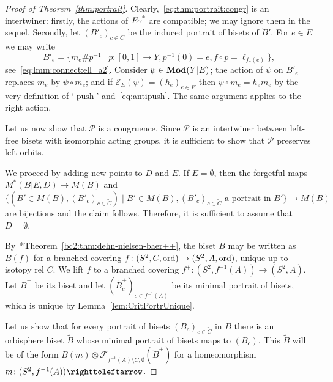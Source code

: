 \documentclass{amsart}
\newcommand\Forget{{\mathcal F}}
\newcommand\Antipush{{\mathcal E}}
\newcommand\Push{{\operatorname{push}}}
\newcommand\wtB{{\widetilde B}}
\newcommand\wtC{{\widetilde C}}
\begin{document}
\begin{proof}[Proof of Theorem~\ref{thm:portrait}]
  Clearly,~\eqref{eq:thm:portrait:congr} is an intertwiner: firstly,
  the actions of $E{\stackrel{\downarrow}{\smash.}}^*$ are compatible; we may ignore them in the
  sequel. Secondly, let $(B'_c)_{c\in \wtC}$ be
  the induced portrait of bisets of $\wtB'$.  For $e\in E$ we
  may write
  \[B'_e=\{m_e\#p^{-1}\mid p\colon[0,1]\to Y,p^{-1}(0)=e,f\circ p=\ell_{f_*(e)}\},
  \]
  see~\eqref{eq:lmm:connect:ell_a2}. Consider $\psi \in \mathbf{\relax Mod}(Y|E)$;
  the action of $\psi$ on $B'_e$ replaces $m_e$ by $\psi\circ m_e$;
  and if $\Antipush_E(\psi)=(h_e)_{e\in E}$ then $\psi\circ m_e=h_e m_e$
  by the very definition of `$\Push$' and~\eqref{eq:antipush}. The same
  argument applies to the right action.

  Let us now show that $\mathcal P$ is a congruence. Since
  $\mathcal P$ is an intertwiner between left-free bisets with
  isomorphic acting groups, it is sufficient to show that $\mathcal P$
  preserves left orbits.

  We proceed by adding new points to $D$ and $E$. If $E=\emptyset$,
  then the forgetful maps $M^*(B|E,D)\to M(B)$ and
  \[\big\{(B'\in M(B),(B'_c)_{c\in\wtC})\mid B'\in M(B),(B'_c)_{c\in\wtC}\text{ a portrait in }B'\big\}\to M(B)\]
  are bijections and the claim follows. Therefore, it is sufficient to
  assume that $D=\emptyset$.

  By~\cite{bartholdi-dudko:bc2}*{Theorem~\ref{bc2:thm:dehn-nielsen-baer++}},
  the biset $B$ may be written as $B(f)$ for a branched covering
  $f\colon(S^2,C,\operatorname{ord})\to(S^2,A,\operatorname{ord})$, unique up to isotopy rel
  $C$. We lift $f$ to a branched covering
  $f^+\colon(S^2,f^{-1}(A))\to(S^2, A)$. Let $\wtB^+$ be its biset and
  let $(\wtB_c^+)_{c\in f^{-1}(A)}$ be its minimal portrait of bisets,
  which is unique by Lemma~\ref{lem:CritPortrUnique}.

  Let us show that for every portrait of bisets
  $(B_c)_{c\in\wtC}$ in $B$ there is an orbisphere biset
  $\wtB$ whose minimal portrait of bisets maps to
  $(B_c)$. This $\wtB$ will be of the form
  $B(m)\otimes \Forget_{f^{-1}(A)\setminus\wtC,\emptyset}(\wtB^+)$ for a homeomorphism
  $m\colon (S^2,f^{-1}(A))\selfmap$.


\end{proof}
\end{document}
